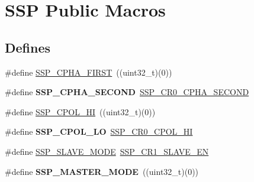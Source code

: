 \hypertarget{group___s_s_p___public___macros}{\section{\-S\-S\-P \-Public \-Macros}
\label{group___s_s_p___public___macros}
}
\subsection*{\-Defines}
\begin{DoxyCompactItemize}
\item 
\#define \hyperlink{group___s_s_p___public___macros_ga6333b5eaf9d5301431fc0399c0d417d5}{\-S\-S\-P\-\_\-\-C\-P\-H\-A\-\_\-\-F\-I\-R\-S\-T}~((uint32\-\_\-t)(0))
\item 
\hypertarget{group___s_s_p___public___macros_ga04ad38295445819979f55503eed5c177}{\#define {\bfseries \-S\-S\-P\-\_\-\-C\-P\-H\-A\-\_\-\-S\-E\-C\-O\-N\-D}~\hyperlink{group___s_s_p___private___macros_gae4150d0b2513ff70568be15c2170c9ea}{\-S\-S\-P\-\_\-\-C\-R0\-\_\-\-C\-P\-H\-A\-\_\-\-S\-E\-C\-O\-N\-D}}\label{group___s_s_p___public___macros_ga04ad38295445819979f55503eed5c177}

\item 
\#define \hyperlink{group___s_s_p___public___macros_gaf64aec37a92ca6c14c23af6fc0052ccb}{\-S\-S\-P\-\_\-\-C\-P\-O\-L\-\_\-\-H\-I}~((uint32\-\_\-t)(0))
\item 
\hypertarget{group___s_s_p___public___macros_ga1e10eccdb2b293607764028aab1b98a9}{\#define {\bfseries \-S\-S\-P\-\_\-\-C\-P\-O\-L\-\_\-\-L\-O}~\hyperlink{group___s_s_p___private___macros_ga36d7ad75edb14d318d710f964384f466}{\-S\-S\-P\-\_\-\-C\-R0\-\_\-\-C\-P\-O\-L\-\_\-\-H\-I}}\label{group___s_s_p___public___macros_ga1e10eccdb2b293607764028aab1b98a9}

\item 
\#define \hyperlink{group___s_s_p___public___macros_gac6bc4b92810caa934b2d7116390098c6}{\-S\-S\-P\-\_\-\-S\-L\-A\-V\-E\-\_\-\-M\-O\-D\-E}~\hyperlink{group___s_s_p___private___macros_ga483d570ffc25bc917c99b3e8ece75649}{\-S\-S\-P\-\_\-\-C\-R1\-\_\-\-S\-L\-A\-V\-E\-\_\-\-E\-N}
\item 
\hypertarget{group___s_s_p___public___macros_ga3c9cbd4f4b8169253d26f4d40cdc414d}{\#define {\bfseries \-S\-S\-P\-\_\-\-M\-A\-S\-T\-E\-R\-\_\-\-M\-O\-D\-E}~((uint32\-\_\-t)(0))}\label{group___s_s_p___public___macros_ga3c9cbd4f4b8169253d26f4d40cdc414d}


\end{DoxyCompactItemize}
